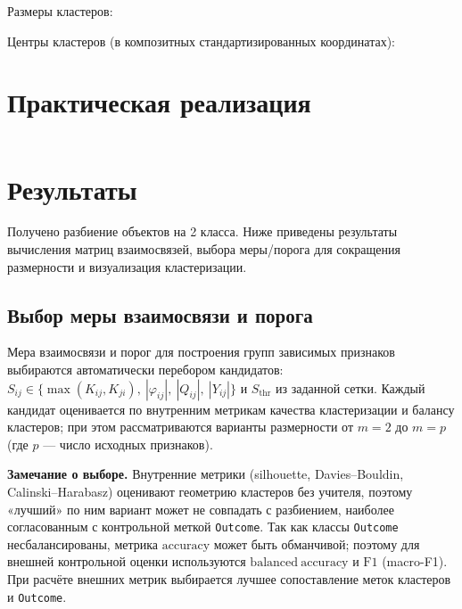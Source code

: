 \documentclass[a4paper, 14pt]{extarticle}
\begin{document}
Размеры кластеров:
\begin{table}[H]
\centering

\caption{Количество объектов в кластерах}
\end{table}

Центры кластеров (в композитных стандартизированных координатах):
\begin{table}[H]
\centering

\caption{Центры кластеров в сниженной размерности}
\end{table}

\section{Практическая реализация}
\newenvironment{longlisting}{\captionsetup{type=listing}}{}
\begin{longlisting}
\caption{Листинг программной реализации (сокращённая версия для отчёта).}
\inputminted[frame=single,fontsize=\footnotesize,linenos,xleftmargin=1.5em,breaklines=true]{python}{modeling_process_lab3_report_clean.py}
\end{longlisting}

\section{Результаты}
Получено разбиение объектов на 2 класса. Ниже приведены результаты вычисления матриц взаимосвязей, выбора меры/порога для сокращения размерности и визуализация кластеризации.

\subsection{Выбор меры взаимосвязи и порога}
Мера взаимосвязи и порог для построения групп зависимых признаков выбираются автоматически перебором кандидатов: \(S_{ij}\in\{\max(K_{ij},K_{ji}),\ |\varphi_{ij}|,\ |Q_{ij}|,\ |Y_{ij}|\}\) и \(S_{\text{thr}}\) из заданной сетки. Каждый кандидат оценивается по внутренним метрикам качества кластеризации и балансу кластеров; при этом рассматриваются варианты размерности от \(m=2\) до \(m=p\) (где \(p\) --- число исходных признаков).

\textbf{Замечание о выборе.} Внутренние метрики (silhouette, Davies--Bouldin, Calinski--Harabasz) оценивают геометрию кластеров без учителя, поэтому «лучший» по ним вариант может не совпадать с разбиением, наиболее согласованным с контрольной меткой \texttt{Outcome}. Так как классы \texttt{Outcome} несбалансированы, метрика \(\mathrm{accuracy}\) может быть обманчивой; поэтому для внешней контрольной оценки используются \(\mathrm{balanced\ accuracy}\) и \(\mathrm{F1}\) (macro-F1). При расчёте внешних метрик выбирается лучшее сопоставление меток кластеров и \texttt{Outcome}.
\end{document}

